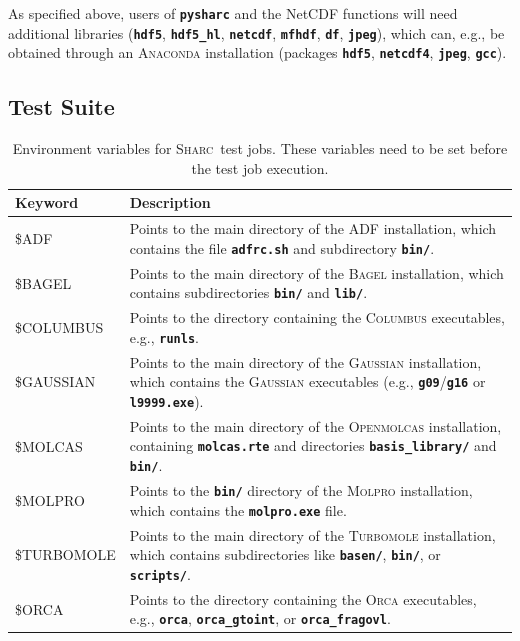 \documentclass[a4paper,10pt,DIV=15,openany]{scrbook}
\newcommand{\sharc}{\textsc{Sharc}}
\newcommand{\ttt}[1]{\textbf{\texttt{#1}}}
\begin{document}
As specified above, users of \ttt{pysharc} and the NetCDF functions will need additional libraries (\ttt{hdf5}, \ttt{hdf5\_hl}, \ttt{netcdf}, \ttt{mfhdf}, \ttt{df}, \ttt{jpeg}), which can, e.g., be obtained through an \textsc{Anaconda} installation (packages \ttt{hdf5}, \ttt{netcdf4}, \ttt{jpeg}, \ttt{gcc}).




\subsection{Test Suite}\label{sec:tests.py}

\begin{table}[tb]
  \centering
  \caption[Environment variables for \sharc\ test jobs.]{Environment variables for \sharc\ test jobs. These variables need to be set before the test job execution.}
  \label{tab:test_vars}
  \begin{tabular}{>{\ttfamily}lp{13cm}}
  \hline
  Keyword       &Description\\
  \hline
  \$ADF         &Points to the main directory of the ADF installation, which contains the file \ttt{adfrc.sh} and subdirectory \ttt{bin/}.\\
  \$BAGEL       &Points to the main directory of the \textsc{Bagel} installation, which contains subdirectories \ttt{bin/} and \ttt{lib/}.\\
  \$COLUMBUS    &Points to the directory containing the \textsc{Columbus} executables, e.g., \ttt{runls}.\\
  \$GAUSSIAN    &Points to the main directory of the \textsc{Gaussian} installation, which contains the \textsc{Gaussian} executables (e.g., \ttt{g09}/\ttt{g16} or \ttt{l9999.exe}).\\
  \$MOLCAS      &Points to the main directory of the \textsc{Openmolcas} installation, containing \ttt{molcas.rte} and directories \ttt{basis\_library/} and \ttt{bin/}.\\
  \$MOLPRO      &Points to the \ttt{bin/} directory of the \textsc{Molpro} installation, which contains the \ttt{molpro.exe} file.\\
  \$TURBOMOLE   &Points to the main directory of the \textsc{Turbomole} installation, which contains subdirectories like \ttt{basen/}, \ttt{bin/}, or \ttt{scripts/}.\\
  \$ORCA        &Points to the directory containing the \textsc{Orca} executables, e.g., \ttt{orca}, \ttt{orca\_gtoint}, or \ttt{orca\_fragovl}.\\

\end{tabular}
\end{table}
\end{document}
